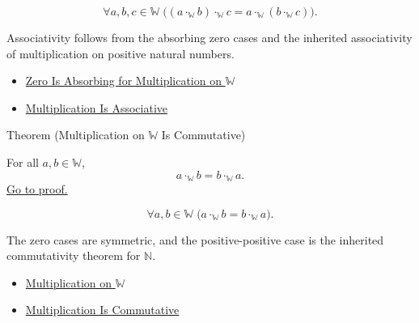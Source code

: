 \begin{remark*}
\[
\forall a,b,c\in\mathbb{W}\;
\bigl((a\cdot_{\mathbb{W}}b)\cdot_{\mathbb{W}}c
=a\cdot_{\mathbb{W}}(b\cdot_{\mathbb{W}}c)\bigr).
\]
\end{remark*}

\begin{remark*}[Interpretation]
Associativity follows from the absorbing zero cases and the inherited
associativity of multiplication on positive natural numbers.
\end{remark*}

\begin{dependencies}
\begin{itemize}
  \item \hyperref[thm:zero-absorbing-for-multiplication-on-w]{Zero Is Absorbing for Multiplication on $\mathbb{W}$}
  \item \hyperref[thm:multiplication-associative]{Multiplication Is Associative}
\end{itemize}
\end{dependencies}

\begin{theorembox}{Theorem (Multiplication on \texorpdfstring{$\mathbb{W}$}{W} Is Commutative)}
\begin{theorem}
\label{thm:multiplication-on-w-commutative}
For all $a,b\in\mathbb{W}$,
\[
a\cdot_{\mathbb{W}}b=b\cdot_{\mathbb{W}}a.
\]
\hyperref[prf:multiplication-on-w-commutative]{Go to proof.}
\end{theorem}
\end{theorembox}

\begin{remark*}
\[
\forall a,b\in\mathbb{W}\;
\bigl(a\cdot_{\mathbb{W}}b=b\cdot_{\mathbb{W}}a\bigr).
\]
\end{remark*}

\begin{remark*}[Interpretation]
The zero cases are symmetric, and the positive-positive case is the inherited
commutativity theorem for $\mathbb{N}$.
\end{remark*}

\begin{dependencies}
\begin{itemize}
  \item \hyperref[def:multiplication-on-w]{Multiplication on $\mathbb{W}$}
  \item \hyperref[thm:multiplication-commutative]{Multiplication Is Commutative}
\end{itemize}
\end{dependencies}

